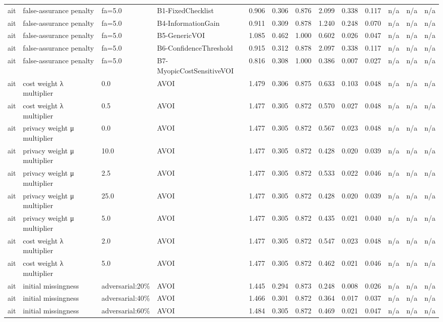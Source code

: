 \begin{table}[!ht]
{\begin{tabular}{lllllllllllll}
ait & false-assurance penalty & fa=5.0 & B1-FixedChecklist & 0.906 & 0.306 & 0.876 & 2.099 & 0.338 & 0.117 & n/a & n/a & n/a \\
ait & false-assurance penalty & fa=5.0 & B4-InformationGain & 0.911 & 0.309 & 0.878 & 1.240 & 0.248 & 0.070 & n/a & n/a & n/a \\
ait & false-assurance penalty & fa=5.0 & B5-GenericVOI & 1.085 & 0.462 & 1.000 & 0.602 & 0.026 & 0.047 & n/a & n/a & n/a \\
ait & false-assurance penalty & fa=5.0 & B6-ConfidenceThreshold & 0.915 & 0.312 & 0.878 & 2.097 & 0.338 & 0.117 & n/a & n/a & n/a \\
ait & false-assurance penalty & fa=5.0 & B7-MyopicCostSensitiveVOI & 0.816 & 0.308 & 1.000 & 0.386 & 0.007 & 0.027 & n/a & n/a & n/a \\
ait & cost weight λ multiplier & 0.0 & AVOI & 1.479 & 0.306 & 0.875 & 0.633 & 0.103 & 0.048 & n/a & n/a & n/a \\
ait & cost weight λ multiplier & 0.5 & AVOI & 1.477 & 0.305 & 0.872 & 0.570 & 0.027 & 0.048 & n/a & n/a & n/a \\
ait & privacy weight μ multiplier & 0.0 & AVOI & 1.477 & 0.305 & 0.872 & 0.567 & 0.023 & 0.048 & n/a & n/a & n/a \\
ait & privacy weight μ multiplier & 10.0 & AVOI & 1.477 & 0.305 & 0.872 & 0.428 & 0.020 & 0.039 & n/a & n/a & n/a \\
ait & privacy weight μ multiplier & 2.5 & AVOI & 1.477 & 0.305 & 0.872 & 0.533 & 0.022 & 0.046 & n/a & n/a & n/a \\
ait & privacy weight μ multiplier & 25.0 & AVOI & 1.477 & 0.305 & 0.872 & 0.428 & 0.020 & 0.039 & n/a & n/a & n/a \\
ait & privacy weight μ multiplier & 5.0 & AVOI & 1.477 & 0.305 & 0.872 & 0.435 & 0.021 & 0.040 & n/a & n/a & n/a \\
ait & cost weight λ multiplier & 2.0 & AVOI & 1.477 & 0.305 & 0.872 & 0.547 & 0.023 & 0.048 & n/a & n/a & n/a \\
ait & cost weight λ multiplier & 5.0 & AVOI & 1.477 & 0.305 & 0.872 & 0.462 & 0.021 & 0.046 & n/a & n/a & n/a \\
ait & initial missingness & adversarial:20\% & AVOI & 1.445 & 0.294 & 0.873 & 0.248 & 0.008 & 0.026 & n/a & n/a & n/a \\
ait & initial missingness & adversarial:40\% & AVOI & 1.466 & 0.301 & 0.872 & 0.364 & 0.017 & 0.037 & n/a & n/a & n/a \\
ait & initial missingness & adversarial:60\% & AVOI & 1.484 & 0.305 & 0.872 & 0.469 & 0.021 & 0.047 & n/a & n/a & n/a \\

\end{tabular}}
\end{table}
